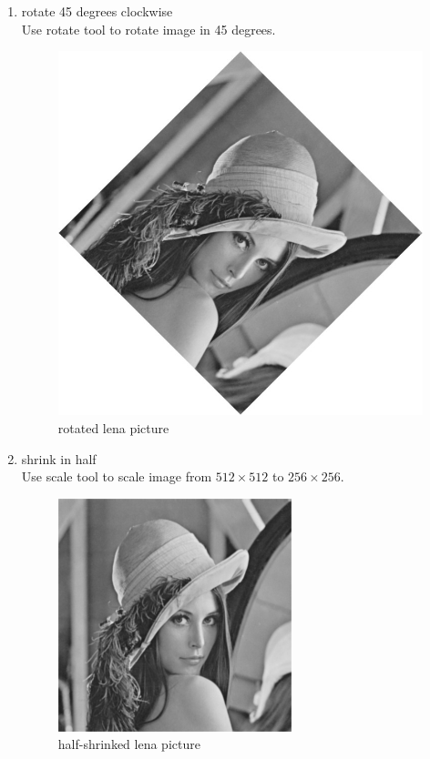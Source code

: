 \documentclass[12pt,twoside,a4paper]{article}
\begin{document}
\begin{enumerate}
  \item rotate 45 degrees clockwise\\
    Use rotate tool to rotate image in 45 degrees.
    \begin{figure}[H]
    \centering
    \includegraphics[scale=0.4]{lena-rotated.jpg}
    \caption{rotated lena picture}
    \label{fig:lena-rotated.jpg}
    \end{figure}
      
  \item shrink in half\\
    Use scale tool to scale image from $512 \times 512$ to $256 \times 256$.
    \begin{figure}[H]
    \centering
    \includegraphics[scale=0.4]{lena-shrinked.jpg}
    \caption{half-shrinked lena picture}
    \label{fig:lena-shrinked.jpg}
    \end{figure}
      

\end{enumerate}
\end{document}
